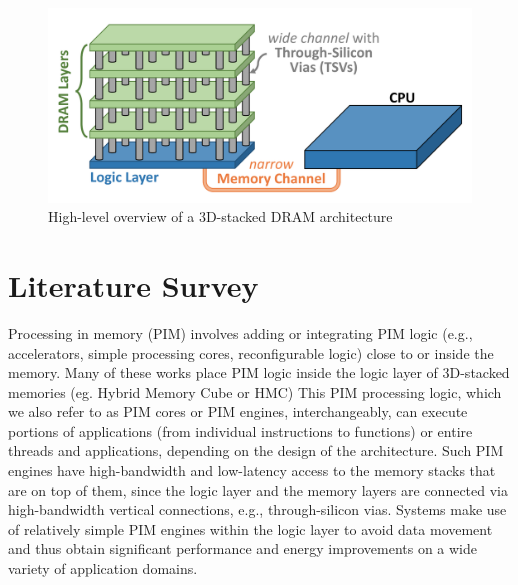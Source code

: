 \documentclass[a4paper,12pt, final]{report}
\begin{document}
\begin{figure}[h]
  \centering
  \includegraphics[width=0.8\linewidth]{3dmem.png}
  \caption{High-level overview of a 3D-stacked DRAM architecture\cite{3dmem}}
\end{figure}

\chapter{Literature Survey}
Processing in memory (PIM) involves adding or integrating PIM logic (e.g., accelerators,
simple processing cores, reconfigurable logic) close to or inside the memory. 
Many of these works place PIM logic inside the logic layer of 3D-stacked
memories (eg. Hybrid Memory Cube or HMC)
This PIM processing logic, which we also refer to as PIM cores or PIM engines, 
interchangeably, can execute portions of applications (from individual instructions to 
functions) or entire threads and applications, depending on the design of the architecture. 
Such PIM engines have high-bandwidth and low-latency access to the memory stacks that are 
on top of them, since the logic layer and the memory layers are connected via high-bandwidth 
vertical connections, e.g., through-silicon vias. Systems make use of relatively simple 
PIM engines within the logic layer to avoid data movement and thus obtain significant 
performance and energy improvements on a wide variety of application domains.
\end{document}
